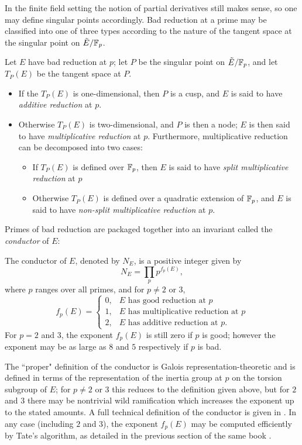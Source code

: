 In the finite field setting the notion of partial derivatives still makes sense, so one may define singular points accordingly. Bad reduction at a prime may be classified into one of three types according to the nature of the tangent space at the singular point on $\tilde{E}/\mathbb{F}_p$.
\begin{definition}
Let $E$ have bad reduction at $p$; let $P$ be the singular point on $\tilde{E}/\mathbb{F}_p$, and let $T_P(E)$ be the tangent space at $P$.
\begin{itemize}
\item If the $T_P(E)$ is one-dimensional, then $P$ is a cusp, and $E$ is said to have {\it additive reduction} at $p$.
\item Otherwise $T_P(E)$ is two-dimensional, and $P$ is then a node; $E$ is then said to have {\it multiplicative reduction} at $p$. Furthermore, multiplicative reduction can be decomposed into two cases:
\begin{itemize}
\item If $T_P(E)$ is defined over $\mathbb{F}_p$, then $E$ is said to have {\it split multiplicative reduction} at $p$
\item Otherwise $T_P(E)$ is defined over a quadratic extension of $\mathbb{F}_p$, and $E$ is said to have {\it non-split multiplicative reduction} at $p$.
\end{itemize}
\end{itemize}
\end{definition}

Primes of bad reduction are packaged together into an invariant called the {\it conductor} of $E$:
\begin{definition}
The conductor of $E$, denoted by $N_E$, is a positive integer given by
\begin{equation}
N_E = \prod_{p} p^{f_p(E)},
\end{equation}
where $p$ ranges over all primes, and for $p \ne 2$ or $3$,
\begin{equation}
f_p(E) = \begin{cases} 0, & \text{$E$ has good reduction at $p$} \\ 1, & \text{$E$ has multiplicative reduction at $p$} \\ 2, & \text{$E$ has additive reduction at $p$.}\end{cases}
\end{equation}
For $p=2$ and $3$, the exponent $f_p(E)$ is still zero if $p$ is good; however the exponent may be as large as $8$ and $5$ respectively if $p$ is bad.
\end{definition}
The ``proper" definition of the conductor is Galois representation-theoretic and is defined in terms of the representation of the inertia group at $p$ on the torsion subgroup of $E$; for $p\ne 2$ or $3$ this reduces to the definition given above, but for $2$ and $3$ there may be nontrivial wild ramification which increases the exponent up to the stated amounts. A full technical definition of the conductor is given in \cite[pp. 379-396]{Sil-1994}. In any case (including $2$ and $3$), the exponent $f_p(E)$ may be computed efficiently by Tate's algorithm, as detailed in the previous section of the same book \cite[pp. 361-379]{Sil-1994}. \\

